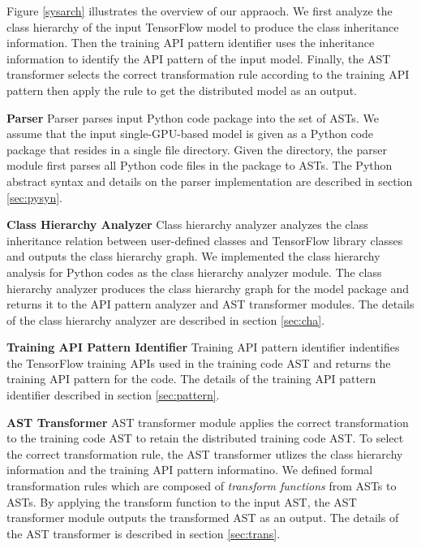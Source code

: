 Figure \ref{sysarch} illustrates the overview of our appraoch.
We first analyze the class hierarchy of the input TensorFlow model
to produce the class inheritance information.
Then the training API pattern identifier uses the inheritance information to
identify the API pattern of the input model.
Finally, the AST transformer selects the correct transformation rule
according to the training API pattern then apply the rule to get the 
distributed model as an output.

\textbf{Parser}
Parser parses input Python code package
into the set of ASTs.
We assume that the input single-GPU-based model is given as a Python code
package that resides in a single file directory.
Given the directory, the parser module first parses all Python code files
in the package to ASTs.
The Python abstract syntax and details on the parser implementation
are described in section \ref{sec:pysyn}.

\textbf{Class Hierarchy Analyzer}
Class hierarchy analyzer analyzes the class inheritance relation
between user-defined classes and TensorFlow library classes and
outputs the class hierarchy graph.
We implemented the class hierarchy analysis
for Python codes as the class hierarchy analyzer module.
The class hierarchy analyzer produces the class hierarchy graph
for the model package and returns it to the API pattern analyzer and 
AST transformer modules. The details of the class hierarchy analyzer are
described in section \ref{sec:cha}.

\textbf{Training API Pattern Identifier}
Training API pattern identifier 
indentifies the TensorFlow training APIs used in the training code AST
and returns the training API pattern for the code.
The details of the training API pattern identifier described 
in section \ref{sec:pattern}.

\textbf{AST Transformer}
AST transformer module applies the correct transformation to the
training code AST to retain the distributed training code AST.
To select the correct transformation rule,
the AST transformer utlizes the class hierarchy information and
the training API pattern informatino.
We defined formal transformation rules which are composed of
\textit{transform functions} from ASTs to ASTs.
By applying the transform function to the input AST,
the AST transformer module outputs the transformed AST as an output.
The details of the AST transformer is described in section \ref{sec:trans}.
